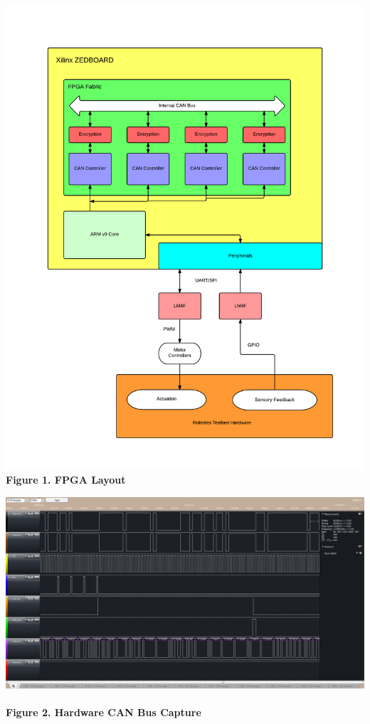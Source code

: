 \documentclass[a0,landscape]{a0poster}
\begin{document}
\begin{multicols}{4}
\includegraphics[scale=0.9]{fpga_layout}
\\
\bf{Figure 1. } FPGA Layout

\includegraphics[width=0.9\linewidth]{UART-CAN_PacketTranslation}
\\
\\
\bf{Figure 2. } Hardware CAN Bus Capture


\end{multicols}
\end{document}
